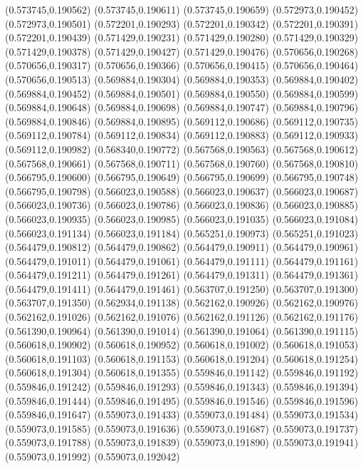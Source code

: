 (0.573745,0.190562)
(0.573745,0.190611)
(0.573745,0.190659)
(0.572973,0.190452)
(0.572973,0.190501)
(0.572201,0.190293)
(0.572201,0.190342)
(0.572201,0.190391)
(0.572201,0.190439)
(0.571429,0.190231)
(0.571429,0.190280)
(0.571429,0.190329)
(0.571429,0.190378)
(0.571429,0.190427)
(0.571429,0.190476)
(0.570656,0.190268)
(0.570656,0.190317)
(0.570656,0.190366)
(0.570656,0.190415)
(0.570656,0.190464)
(0.570656,0.190513)
(0.569884,0.190304)
(0.569884,0.190353)
(0.569884,0.190402)
(0.569884,0.190452)
(0.569884,0.190501)
(0.569884,0.190550)
(0.569884,0.190599)
(0.569884,0.190648)
(0.569884,0.190698)
(0.569884,0.190747)
(0.569884,0.190796)
(0.569884,0.190846)
(0.569884,0.190895)
(0.569112,0.190686)
(0.569112,0.190735)
(0.569112,0.190784)
(0.569112,0.190834)
(0.569112,0.190883)
(0.569112,0.190933)
(0.569112,0.190982)
(0.568340,0.190772)
(0.567568,0.190563)
(0.567568,0.190612)
(0.567568,0.190661)
(0.567568,0.190711)
(0.567568,0.190760)
(0.567568,0.190810)
(0.566795,0.190600)
(0.566795,0.190649)
(0.566795,0.190699)
(0.566795,0.190748)
(0.566795,0.190798)
(0.566023,0.190588)
(0.566023,0.190637)
(0.566023,0.190687)
(0.566023,0.190736)
(0.566023,0.190786)
(0.566023,0.190836)
(0.566023,0.190885)
(0.566023,0.190935)
(0.566023,0.190985)
(0.566023,0.191035)
(0.566023,0.191084)
(0.566023,0.191134)
(0.566023,0.191184)
(0.565251,0.190973)
(0.565251,0.191023)
(0.564479,0.190812)
(0.564479,0.190862)
(0.564479,0.190911)
(0.564479,0.190961)
(0.564479,0.191011)
(0.564479,0.191061)
(0.564479,0.191111)
(0.564479,0.191161)
(0.564479,0.191211)
(0.564479,0.191261)
(0.564479,0.191311)
(0.564479,0.191361)
(0.564479,0.191411)
(0.564479,0.191461)
(0.563707,0.191250)
(0.563707,0.191300)
(0.563707,0.191350)
(0.562934,0.191138)
(0.562162,0.190926)
(0.562162,0.190976)
(0.562162,0.191026)
(0.562162,0.191076)
(0.562162,0.191126)
(0.562162,0.191176)
(0.561390,0.190964)
(0.561390,0.191014)
(0.561390,0.191064)
(0.561390,0.191115)
(0.560618,0.190902)
(0.560618,0.190952)
(0.560618,0.191002)
(0.560618,0.191053)
(0.560618,0.191103)
(0.560618,0.191153)
(0.560618,0.191204)
(0.560618,0.191254)
(0.560618,0.191304)
(0.560618,0.191355)
(0.559846,0.191142)
(0.559846,0.191192)
(0.559846,0.191242)
(0.559846,0.191293)
(0.559846,0.191343)
(0.559846,0.191394)
(0.559846,0.191444)
(0.559846,0.191495)
(0.559846,0.191546)
(0.559846,0.191596)
(0.559846,0.191647)
(0.559073,0.191433)
(0.559073,0.191484)
(0.559073,0.191534)
(0.559073,0.191585)
(0.559073,0.191636)
(0.559073,0.191687)
(0.559073,0.191737)
(0.559073,0.191788)
(0.559073,0.191839)
(0.559073,0.191890)
(0.559073,0.191941)
(0.559073,0.191992)
(0.559073,0.192042)
